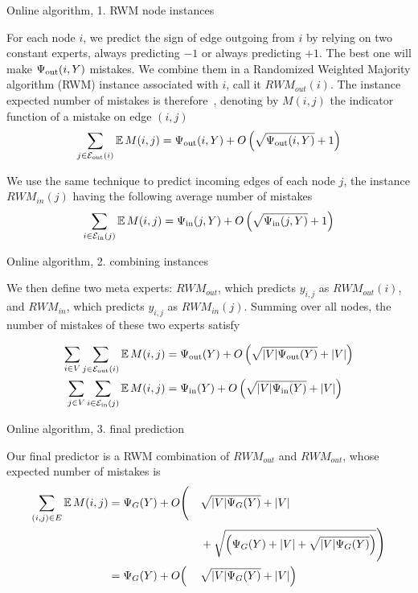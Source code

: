 \documentclass[10pt,svgnames,ignorenonframetext,final]{beamer}
\begin{document}
\begin{frame}{Online algorithm, 1. RWM node instances}

For each node \(i\), we predict the sign of edge outgoing from \(i\) by
relying on two constant experts, always predicting \(-1\) or always
predicting \(+1\). The best one will make \(\Psi_{\mathrm{out}}(i, Y)\) mistakes. We
combine them in a Randomized Weighted Majority algorithm (RWM) instance
associated with \(i\), call it \(RWM_{out}(i)\). The instance expected
number of mistakes is therefore~\autocite{acg02},
denoting by \(M(i,j)\) the indicator function of a mistake on edge
\((i,j)\)
\[\sum_{j \in \mathcal{E}_{\mathrm{out}}(i)} \mathbb{E}\,M(i,j) = \Psi_{\mathrm{out}}(i,Y) + O\left(\sqrt{\Psi_{\mathrm{out}}(i,Y)}+ 1\right)\]

We use the same technique to predict incoming edges of each node \(j\),
the instance \(RWM_{in}(j)\) having the following average number of
mistakes
\[\sum_{i \in \mathcal{E}_{\mathrm{in}}(j)} \mathbb{E}\,M(i,j) = \Psi_{\mathrm{in}}(j,Y) + O\left(\sqrt{\Psi_{\mathrm{in}}(j,Y)} + 1\right)\]

\end{frame}

\begin{frame}{Online algorithm, 2. combining instances}

We then define two meta experts: \(RWM_{out}\), which predicts
\(y_{i,j}\) as \(RWM_{out}(i)\), and \(RWM_{in}\), which predicts
\(y_{i,j}\) as \(RWM_{in}(j)\). Summing over all nodes, the number of
mistakes of these two experts satisfy

\begin{align*}
    \sum_{i \in V}\sum_{j \in \mathcal{E}_{\mathrm{out}}(i)} \mathbb{E}\,M(i,j) &= \Psi_{\mathrm{out}}(Y) + O\left(\sqrt{|V|\Psi_{\mathrm{out}}(Y)} + |V|\right) \\
    \sum_{j \in V}\sum_{i \in \mathcal{E}_{\mathrm{in}}(j)} \mathbb{E}\,M(i,j)  &= \Psi_{\mathrm{in}}(Y)  + O\left(\sqrt{|V|\Psi_{\mathrm{in}}(Y)}  + |V|\right)
\end{align*}
\end{frame}

\begin{frame}{Online algorithm, 3. final prediction}

Our final predictor is a RWM combination of \(RWM_{out}\) and
\(RWM_{out}\), whose expected number of mistakes is
\begin{alignat*}{3}
    \sum_{(i,j) \in E} \mathbb{E}\,M(i,j) 
    &= \Psi_G(Y) + O\Biggl(&&\sqrt{|V|\Psi_G(Y)} + |V| \\
  & &&+ \sqrt{\Bigl(\Psi_G(Y) + |V| + \sqrt{|V|\Psi_G(Y)}\Bigr)} \Biggr)\\
    &= \Psi_G(Y) + O\Bigl( &&\sqrt{|V|\Psi_G(Y)} + |V|\Bigr)
\end{alignat*}

\end{frame}
\end{document}
